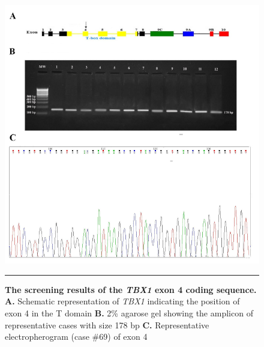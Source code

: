 \begin{refsection}
\begin{figure}[!thb]
\centering
\includegraphics[width=\linewidth]{Figures/Figure4_4TBX4.pdf}
\rule{35em}{0.5pt}
\caption[The screening results of the \textit{TBX1} exon 4 coding sequence]{\textbf{The screening results of the \textit{TBX1} exon 4 coding sequence.}
\textbf{A.} Schematic representation of \textit{TBX1} indicating the position of exon 4 in the T domain 
\textbf{B.} 2\% agarose gel showing the amplicon of representative cases with size 178 bp 
\textbf{C.} Representative electropherogram (case \#69) of exon 4}
\label{fig:4_4}
\end{figure}


\end{refsection}
